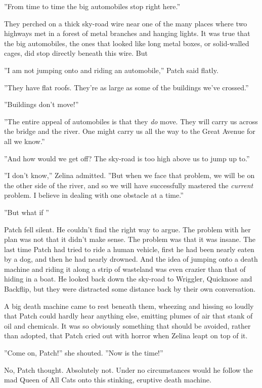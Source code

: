 \documentclass[11pt]{article}
\begin{document}
 ''From time to time the big automobiles stop right here.''\par
They perched on a thick sky-road wire near one of the many places where two highways met in a forest of metal branches and hanging lights. It was true that the big automobiles, the ones that looked like long metal boxes, or solid-walled cages, did stop directly beneath this wire. But %
\par
''I am not jumping onto and riding an automobile,'' Patch said flatly.\par
''They have flat roofs. They're as large as some of the buildings we've crossed.''\par
''Buildings don't move!''\par
''The entire appeal of automobiles is that they {\it do} move. They will carry us across the bridge and the river. One might carry us all the way to the Great Avenue for all we know.''\par
''And how would we get off? The sky-road is too high above us to jump up to.''\par
''I don't know,'' Zelina admitted. ''But when we face that problem, we will be on the other side of the river, and so we will have successfully mastered the {\it current} problem. I believe in dealing with one obstacle at a time.''\par
''But%
what if%
''\par
Patch fell silent. He couldn't find the right way to argue. The problem with her plan was not that it didn't make sense. The problem was that it was insane. The last time Patch had tried to ride a human vehicle, first he had been nearly eaten by a dog, and then he had nearly drowned. And the idea of jumping onto a death machine and riding it along a strip of wasteland was even crazier than that of hiding in a boat. He looked back down the sky-road to Wriggler, Quicknose and Backflip, but they were distracted some distance back by their own conversation.\par
A big death machine came to rest beneath them, wheezing and hissing so loudly that Patch could hardly hear anything else, emitting plumes of air that stank of oil and chemicals. It was so obviously something that should be avoided, rather than adopted, that Patch cried out with horror when Zelina leapt on top of it.\par
''Come on, Patch!'' she shouted. ''Now is the time!''\par
No, Patch thought. Absolutely not. Under no circumstances would he follow the mad Queen of All Cats onto this stinking, eruptive death machine.\par
\end{document}
